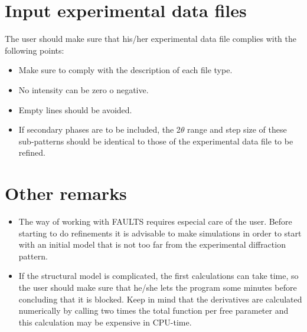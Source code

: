 \section{Input experimental data files}

The user should make sure that his/her experimental data file complies with the following points: 

\begin{itemize}

	\item Make sure to comply with the description of each file type.

	\item No intensity can be zero o negative.

	\item Empty lines should be avoided.
	
  \item If secondary phases are to be included, the 2$\theta$ range and step size of these sub-patterns should be identical to those of the experimental data file to be refined. 
	
\end{itemize}

\section{Other remarks}

\begin{itemize}

	\item The way of working with FAULTS requires especial care of the user. Before starting to do refinements it is advisable to make simulations in order to start with an initial model that is not too far from the experimental diffraction pattern. 
	
	\item If the structural model is complicated, the first calculations can take time, so the user should make sure that he/she lets the program some minutes before concluding that it is blocked. Keep in mind that the derivatives are calculated numerically by calling two times the total function per free parameter and this calculation may be expensive in CPU-time.

\end{itemize}
 





